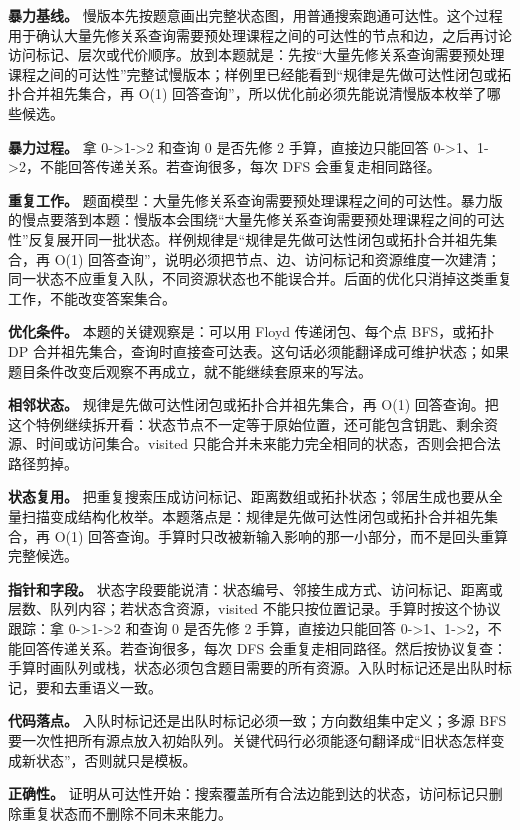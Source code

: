 \textbf{暴力基线。} 慢版本先按题意画出完整状态图，用普通搜索跑通可达性。这个过程用于确认大量先修关系查询需要预处理课程之间的可达性的节点和边，之后再讨论访问标记、层次或代价顺序。放到本题就是：先按“大量先修关系查询需要预处理课程之间的可达性”完整试慢版本；样例里已经能看到“规律是先做可达性闭包或拓扑合并祖先集合，再 O(1) 回答查询”，所以优化前必须先能说清慢版本枚举了哪些候选。

\textbf{暴力过程。} 拿 0->1->2 和查询 0 是否先修 2 手算，直接边只能回答 0->1、1->2，不能回答传递关系。若查询很多，每次 DFS 会重复走相同路径。

\textbf{重复工作。} 题面模型：大量先修关系查询需要预处理课程之间的可达性。暴力版的慢点要落到本题：慢版本会围绕“大量先修关系查询需要预处理课程之间的可达性”反复展开同一批状态。样例规律是“规律是先做可达性闭包或拓扑合并祖先集合，再 O(1) 回答查询”，说明必须把节点、边、访问标记和资源维度一次建清；同一状态不应重复入队，不同资源状态也不能误合并。后面的优化只消掉这类重复工作，不能改变答案集合。

\textbf{优化条件。} 本题的关键观察是：可以用 Floyd 传递闭包、每个点 BFS，或拓扑 DP 合并祖先集合，查询时直接查可达表。这句话必须能翻译成可维护状态；如果题目条件改变后观察不再成立，就不能继续套原来的写法。

\textbf{相邻状态。} 规律是先做可达性闭包或拓扑合并祖先集合，再 O(1) 回答查询。把这个特例继续拆开看：状态节点不一定等于原始位置，还可能包含钥匙、剩余资源、时间或访问集合。visited 只能合并未来能力完全相同的状态，否则会把合法路径剪掉。

\textbf{状态复用。} 把重复搜索压成访问标记、距离数组或拓扑状态；邻居生成也要从全量扫描变成结构化枚举。本题落点是：规律是先做可达性闭包或拓扑合并祖先集合，再 O(1) 回答查询。手算时只改被新输入影响的那一小部分，而不是回头重算完整候选。

\textbf{指针和字段。} 状态字段要能说清：状态编号、邻接生成方式、访问标记、距离或层数、队列内容；若状态含资源，visited 不能只按位置记录。手算时按这个协议跟踪：拿 0->1->2 和查询 0 是否先修 2 手算，直接边只能回答 0->1、1->2，不能回答传递关系。若查询很多，每次 DFS 会重复走相同路径。然后按协议复查：手算时画队列或栈，状态必须包含题目需要的所有资源。入队时标记还是出队时标记，要和去重语义一致。

\textbf{代码落点。} 入队时标记还是出队时标记必须一致；方向数组集中定义；多源 BFS 要一次性把所有源点放入初始队列。关键代码行必须能逐句翻译成“旧状态怎样变成新状态”，否则就只是模板。

\textbf{正确性。} 证明从可达性开始：搜索覆盖所有合法边能到达的状态，访问标记只删除重复状态而不删除不同未来能力。

